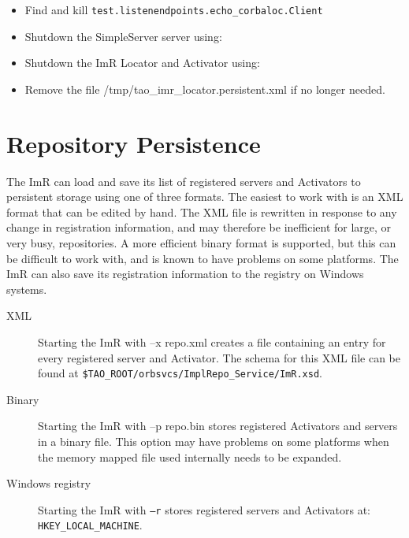 \begin{itemize}
    \item Find and kill {\tt test.listenendpoints.echo_corbaloc.Client}
    \item Shutdown the SimpleServer server using:


    \item Shutdown the ImR Locator and Activator using:


    \item Remove the file /tmp/tao\_imr\_locator.persistent.xml if no longer needed.
\end{itemize}

\section{Repository Persistence}

The ImR can load and save its list of registered servers and Activators to
persistent storage using one of three formats. The easiest to work with is
an XML format that can be edited by hand. The XML file is rewritten in
response to any change in registration information, and may therefore be
inefficient for large, or very busy, repositories. A more efficient binary
format is supported, but this can be difficult to work with, and is known
to have problems on some platforms. The ImR can also save its registration
information to the registry on Windows systems.

\begin{description}
    \item [XML] Starting the ImR with –x repo.xml creates a file containing
              an entry for every registered server and Activator. The schema for
              this XML file can be found at
              {\tt \$TAO\_ROOT/orbsvcs/ImplRepo\_Service/ImR.xsd}.

    \item [Binary] Starting the ImR with –p repo.bin stores registered
              Activators  and servers in a binary file.   This option may have
              problems on some platforms when the memory mapped file
              used internally needs to be expanded.

    \item [Windows registry] Starting the ImR with {\tt –r} stores registered servers
               and Activators at:
               {\tt HKEY_LOCAL_MACHINE\SOFTWARE\TAO\ImplementationRepository}.
 \end{description}

